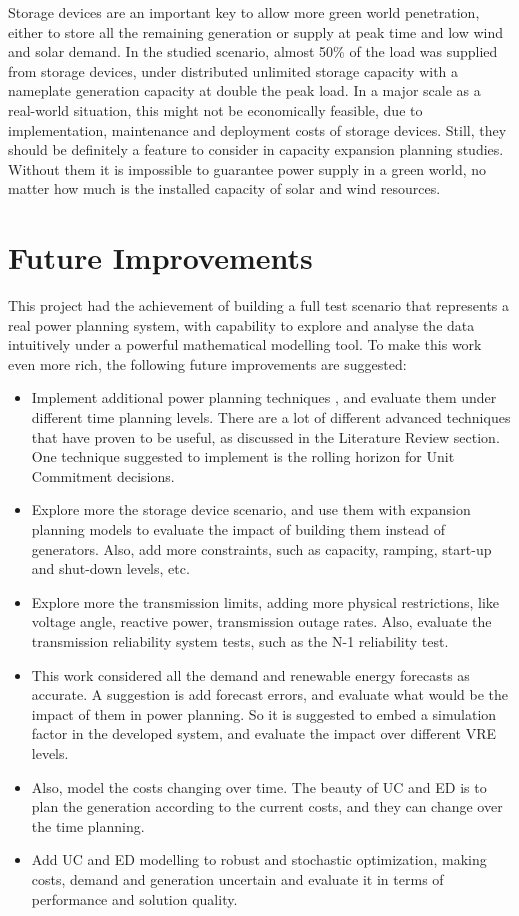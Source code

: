 \documentclass[12pt,LUDisStyle,twosided]{book}
\begin{document}
Storage devices are an important key to allow more green world penetration, either to store all the remaining generation or supply at peak time and low wind and solar demand. In the studied scenario, almost 50\% of the load was supplied from storage devices, under distributed unlimited storage capacity with a nameplate generation capacity at double the peak load. In a major scale as a real-world situation, this might not be economically feasible, due to implementation, maintenance and deployment costs of storage devices. Still, they should be definitely a feature to consider in capacity expansion planning studies. Without them it is impossible to guarantee power supply in a green world, no matter how much is the installed capacity of solar and wind resources.

\section{Future Improvements}

This project had the achievement of building a full test scenario that represents a real power planning system, with capability to explore and analyse the data intuitively under a powerful mathematical modelling tool. To make this work even more rich, the following future improvements are suggested:

\begin{itemize}
\item Implement additional power planning techniques , and evaluate them under different time planning levels. There are a lot of different advanced techniques that have proven to be useful, as discussed in the Literature Review section. One technique suggested to implement is the rolling horizon for Unit Commitment decisions.
\item Explore more the storage device scenario, and use them with expansion planning models to evaluate the impact of building them instead of generators. Also, add more constraints, such as capacity, ramping, start-up and shut-down levels, etc.
\item Explore more the transmission limits, adding more physical restrictions, like voltage angle, reactive power, transmission outage rates. Also, evaluate the transmission reliability system tests, such as the N-1 reliability test.
\item This work considered all the demand and renewable energy forecasts as accurate. A suggestion is add forecast errors, and evaluate what would be the impact of them in power planning. So it is suggested to embed a simulation factor in the developed system, and evaluate the impact over different VRE levels.
\item Also, model the costs changing over time. The beauty of UC and ED is to plan the generation according to the current costs, and they can change over the time planning.
\item Add UC and ED modelling to robust and stochastic optimization, making costs, demand and generation uncertain and evaluate it in terms of performance and solution quality.

\end{itemize}


%

\nocite{*}



\end{document}
